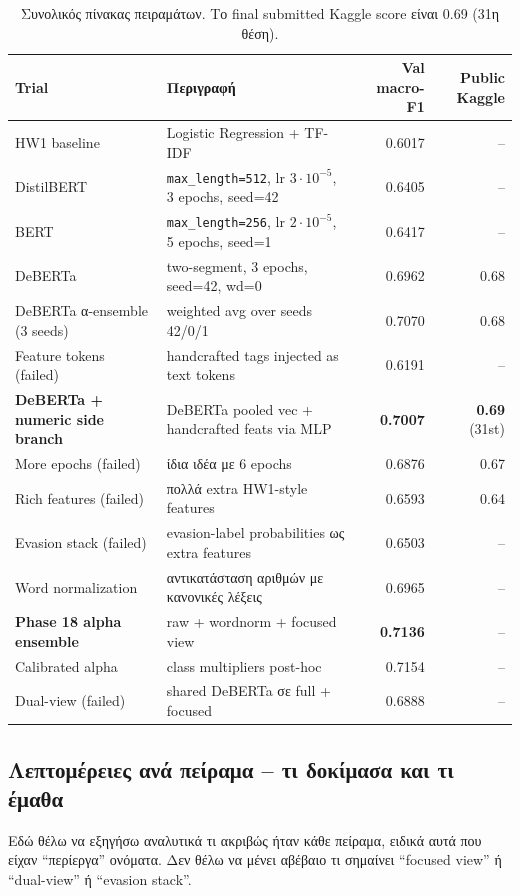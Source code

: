 \documentclass[12pt]{fphw}
\begin{document}
\begin{table}[H]
\centering
\small
\begin{tabularx}{\textwidth}{lXrr}
\toprule
Trial & Περιγραφή & Val macro-F1 & Public Kaggle \\
\midrule
HW1 baseline & Logistic Regression + TF-IDF & 0.6017 & -- \\
DistilBERT & \texttt{max\_length=512}, lr $3 \cdot 10^{-5}$, 3 epochs, seed=42 & 0.6405 & -- \\
BERT & \texttt{max\_length=256}, lr $2 \cdot 10^{-5}$, 5 epochs, seed=1 & 0.6417 & -- \\
DeBERTa & two-segment, 3 epochs, seed=42, wd=0 & 0.6962 & ~0.68 \\
DeBERTa α-ensemble (3 seeds) & weighted avg over seeds 42/0/1 & 0.7070 & 0.68 \\
Feature tokens (failed) & handcrafted tags injected as text tokens & 0.6191 & -- \\
\textbf{DeBERTa + numeric side branch} & DeBERTa pooled vec + handcrafted feats via MLP & \textbf{0.7007} & \textbf{0.69} (31st) \\
More epochs (failed) & ίδια ιδέα με 6 epochs & 0.6876 & 0.67 \\
Rich features (failed) & πολλά extra HW1-style features & 0.6593 & 0.64 \\
Evasion stack (failed) & evasion-label probabilities ως extra features & 0.6503 & -- \\
Word normalization & αντικατάσταση αριθμών με κανονικές λέξεις & 0.6965 & -- \\
\textbf{Phase 18 alpha ensemble} & raw + wordnorm + focused view & \textbf{0.7136} & -- \\
Calibrated alpha & class multipliers post-hoc & 0.7154 & -- \\
Dual-view (failed) & shared DeBERTa σε full + focused & 0.6888 & -- \\
\bottomrule
\end{tabularx}
\caption{Συνολικός πίνακας πειραμάτων. Το final submitted Kaggle score είναι 0.69 (31η θέση).}
\label{tab:trials}
\end{table}

\subsection{Λεπτομέρειες ανά πείραμα -- τι δοκίμασα και τι έμαθα}

Εδώ θέλω να εξηγήσω αναλυτικά τι ακριβώς ήταν κάθε πείραμα, ειδικά αυτά που είχαν ``περίεργα'' ονόματα. Δεν θέλω να μένει αβέβαιο τι σημαίνει ``focused view'' ή ``dual-view'' ή ``evasion stack''.
\end{document}
